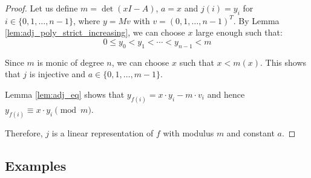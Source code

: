 \begin{proof}
Let us define $m = \det(x I - A)$, $a = x$ and $j(i) = y_i$ for $i \in \{0,1,\ldots,n-1\}$, where $y = Mv$ with $v = (0,1,\ldots,n-1)^T$. 
By Lemma \ref{lem:adj_poly_strict_increasing}, we can choose $x$ large enough such that:
$$0 \le y_0 < y_1 < \cdots < y_{n-1} < m$$

Since $m$ is monic of degree $n$, we can choose $x$ such that $x < m(x)$. This shows that $j$ is injective and $a \in \{0,1,\ldots,m-1\}$.

Lemma \ref{lem:adj_eq} shows that $y_{f(i)} = x\cdot y_i - m\cdot v_i$ and hence $y_{f(i)} \equiv x\cdot y_i \pmod{m}$.

Therefore, $j$ is a linear representation of $f$ with modulus $m$ and constant $a$.
\end{proof}

\subsection*{Examples}

